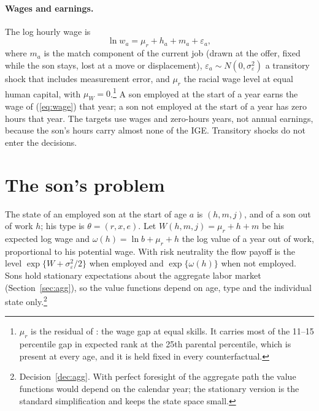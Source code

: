\documentclass[11pt]{article}
\newcommand{\1}{\mathbf{1}}
\begin{document}
\paragraph{Wages and earnings.} The log hourly wage is
\begin{equation}\label{eq:wage}
\ln w_a = \mu_r + h_a + m_a + \varepsilon_a ,
\end{equation}
where $m_a$ is the match component of the current job (drawn at the offer, fixed while the son stays, lost at a move or
displacement), $\varepsilon_a \sim N(0, \sigma_\varepsilon^2)$ a transitory shock that includes measurement error, and
$\mu_r$ the racial wage level at equal human capital, with $\mu_W = 0$.\footnote{$\mu_r$ is the residual of
\citet{neal1996role}: the wage gap at equal skills. It carries most of the 11--15 percentile gap in expected rank at the
25th parental percentile, which is present at every age, and it is held fixed in every counterfactual.} A son employed at the start of a year earns the wage of (\ref{eq:wage}) that year; a son not employed at the start
of a year has zero hours that year. The targets use wages and zero-hours years, not annual earnings, because the son's
hours carry almost none of the IGE. Transitory shocks do not enter the decisions.

\section{The son's problem}\label{sec:bellman}

The state of an employed son at the start of age $a$ is $(h, m, j)$, and of a son out of work $h$; his type is
$\theta = (r, x, e)$. Let $W(h, m, j) = \mu_r + h + m$ be his expected log wage and $\omega(h) = \ln b + \mu_r + h$ the
log value of a year out of work, proportional to his potential wage. With risk neutrality the flow payoff is the level
$\exp\{W + \sigma_\varepsilon^2/2\}$ when employed and $\exp\{\omega(h)\}$ when not employed. Sons hold
stationary expectations about the aggregate labor market (Section~\ref{sec:agg}), so the value functions depend on age,
type and the individual state only.\footnote{Decision~\ref{dec:agg}. With perfect foresight of the aggregate path the
value functions would depend on the calendar year; the stationary version is the standard simplification and keeps the
state space small.}
\end{document}
